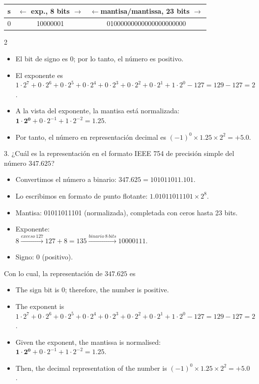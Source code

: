 \begin{center}
\begin{tabular}{|c||c||c|}
\hline
s&$\leftarrow$ exp., 8 bits $\rightarrow$&$\leftarrow$mantisa/mantissa, 23 bits $\rightarrow$\\
\hline
0&10000001&01000000000000000000000\\
\hline
\end{tabular}
\end{center}
\begin{paracol}{2}
\begin{itemize}[leftmargin=\dimexpr 26pt-.25in]
\item El bit de signo es 0; por lo tanto, el número es positivo.
\item El exponente es $1\cdot2^7+0\cdot2^6+0\cdot2^5+0\cdot2^4+0\cdot2^3+0\cdot2^2+0\cdot2^1+1\cdot2^0-127=129-127=2$.
\item A la vista del exponente, la mantisa está normalizada: $\mathbf{1\cdot 2^0}+0\cdot2^{-1}+1\cdot2^{-2}=1.25$.
\item Por tanto, el número en representación decimal es $ (-1)^0\times1.25\times2^{2}=+5.0$.
\end{itemize}

3. ¿Cuál es la representación en el formato IEEE 754 de precisión simple del número $347.625$?
\begin{itemize}[leftmargin=\dimexpr 26pt-.25in]
\item Convertimos el número a binario: $347.625 = 101011011.101$.
\item Lo escribimos en formato de punto flotante: $1.01011011101\times 2^{8}$.
\item Mantisa: 01011011101 (normalizada), completada con ceros hasta 23 bits.
\item Exponente:\\ $8 \xrightarrow{exceso\ 127} 127+8=135  \xrightarrow{binario \ 8 \ bits} 10000111$.
\item Signo: 0 (positivo).
\end{itemize}
Con lo cual, la representación de $347.625$ es
\switchcolumn
\begin{itemize}[leftmargin=\dimexpr 26pt-.25in]
	\item The sign bit is 0; therefore, the number is positive.
	\item The exponent is $1\cdot2^7+0\cdot2^6+0\cdot2^5+0\cdot2^4+0\cdot2^3+0\cdot2^2+0\cdot2^1+1\cdot2^0-127=129-127=2$.
	\item Given the exponent, the mantissa is normalised: $\mathbf{1\cdot 2^0}+0\cdot2^{-1}+1\cdot2^{-2}=1.25$.
	\item Then, the decimal representation of the number is $ (-1)^0\times1.25\times2^{2}=+5.0$.
\end{itemize}


\end{paracol}
